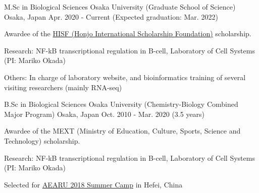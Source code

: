 

\begin{cventries}

  \cventry
    {M.Sc in Biological Sciences} %
    {Osaka University (Graduate School of Science)} %
    {Osaka, Japan} %
    {Apr. 2020 - Current (Expected graduation: Mar. 2022)} %
    {
      \begin{cvitems} %
        \item {Awardee of the \href{https://www.hisf.or.jp/en/}{HISF (Honjo International Scholarship Foundation)} scholarship.} 
        \item {Research: NF-kB transcriptional regulation in B-cell, Laboratory of Cell Systems (PI: Mariko Okada)}
        \item {Others: In charge of laboratory website, and bioinformatics training of several visiting researchers (mainly RNA-seq)}
      \end{cvitems}
    }
  \cventry
    {B.Sc in Biological Sciences} %
    {Osaka University (Chemistry-Biology Combined Major Program)}  %
    {Osaka, Japan} %
    {Oct. 2010 - Mar. 2020 (3.5 years)} %
    {
      \begin{cvitems} %
        \item {Awardee of the MEXT (Ministry of Education, Culture, Sports, Science and Technology) scholarship.}
        \item {Research: NF-kB transcriptional regulation in B-cell, Laboratory of Cell Systems (PI: Mariko Okada)}
        \item {Selected for \href{http://www.aearu.com/camp_data/AEARU\%202018\%20Student\%20Summer\%20Camp\%20Activity\%20Report.pdf}{AEARU 2018 Summer Camp} in Hefei, China }
      \end{cvitems}
    }

\end{cventries}

